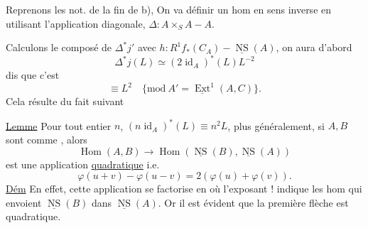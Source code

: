 
Reprenons les not.  de la fin de b), On va définir un hom en sens inverse
en utilisant l'application diagonale, $\Delta:A\times_S A\mathbin{-}A$.

Calculons le composé  de $\Delta^*j'$ avec $h:R^1f_*(C_A)\mathbin{-}\underline{\operatorname{NS}}(A)$, on aura d'abord
\[
\Delta^*j(L)\simeq(2\operatorname{id}_A)^*(L)L^{-2}
\]
 dis que c'est
\[
\equiv L^2\quad\{\mathrm{mod}\ A'=\underline{\operatorname{Ext}}^1(A,C)\}.
\]
Cela résulte du fait suivant

\uline{Lemme} Pour tout entier $n$, $(n\operatorname{id}_A)^*(L)\equiv n^2L$,
 plus généralement, si $A,B$ sont comme , alors
\[
\operatorname{Hom}(A,B)\longrightarrow\operatorname{Hom}(\underline{\operatorname{NS}}(B),\underline{\operatorname{NS}}(A))
\]
est une application \uline{quadratique} i.e.
\[
\varphi(u+v)-\varphi(u-v)=2(\varphi(u)+\varphi(v)).
\]
 \uline{Dém} En effet, cette application se factorise en
où l'exposant ! indique les hom qui envoient $\underline{\operatorname{NS}}(B)$ dans $\underline{\operatorname{NS}}(A)$.  Or il est évident que la première flèche est quadratique.

